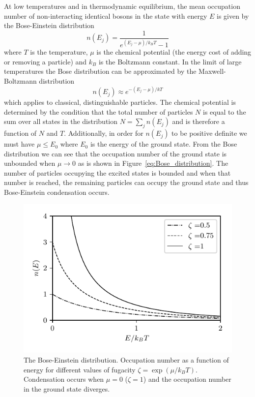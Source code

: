 At low temperatures and in thermodynamic equilibrium, the mean occupation number of non-interacting identical bosons in the state with energy $E$ is given by the Bose-Einstein distribution
%
\begin{equation}
	n(E_j)=\frac{1}{e^{(E_j-\mu)/k_BT}-1}
	\label{eq:Bose_distribution}	
\end{equation}
%
where $T$ is the temperature, $\mu$ is the chemical potential (the energy cost of adding or removing a particle) and $k_B$ is the Boltzmann constant. In the limit of large temperatures the Bose distribution can be approximated by the Maxwell-Boltzmann distribution
%
\begin{equation}
	n(E_j)\approx e^{-(E_j-\mu)/kT}
\end{equation}
%
which applies to classical, distinguishable particles. The chemical potential is determined by the condition that the total number of particles $N$ is equal to the sum over all states in the distribution $N=\sum_jn(E_j)$ and is therefore a function of $N$ and $T$. Additionally, in order for $n(E_j)$ to be positive definite we must have $\mu\leq E_0$ where $E_0$ is the energy of the ground state. From the Bose distribution we can see that the occupation number of the ground state is unbounded when $\mu\rightarrow0$ as is shown in Figure~\ref{eq:Bose_distribution}. The number of particles occupying the excited states is bounded and when that number is reached, the remaining particles can occupy the ground state and thus Bose-Einstein condensation occurs. 

\begin{figure}[htb]
\begin{center}
\includegraphics[]{Figures/Chapter2/Bose_distribution.pdf}
\caption[The Bose-Einstein distribution]{The Bose-Einstein distribution. Occupation number as a function of energy for different values of fugacity $\zeta=\exp(\mu /k_BT)$. Condensation occurs when $\mu=0$ ($\zeta=1$) and the occupation number in the ground state diverges.}
\label{fig:Bose_distribution}
\end{center}
\end{figure}

